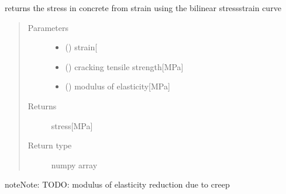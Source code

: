\documentclass[letterpaper,10pt,english]{sphinxmanual}
\begin{document}
\begin{fulllineitems}
\label{\detokenize{cracking:cracking.bilinear_stress_strain}}
\sphinxAtStartPar
returns the stress in concrete from strain using the bilinear stress\sphinxhyphen{}strain curve
\begin{quote}\begin{description}
\item[{Parameters}] \leavevmode\begin{itemize}
\item {} 
\sphinxAtStartPar
{} () \textendash{} strain{[}\sphinxhyphen{}{]}

\item {} 
\sphinxAtStartPar
{} () \textendash{} cracking tensile strength{[}MPa{]}

\item {} 
\sphinxAtStartPar
{} () \textendash{} modulus of elasticity{[}MPa{]}

\end{itemize}

\item[{Returns}] \leavevmode
\sphinxAtStartPar
stress{[}MPa{]}

\item[{Return type}] \leavevmode
\sphinxAtStartPar
numpy array

\end{description}\end{quote}

\begin{sphinxadmonition}{note}{Note:}
\sphinxAtStartPar
TODO: modulus of elasticity reduction due to creep
\end{sphinxadmonition}

\end{fulllineitems}

\end{document}
